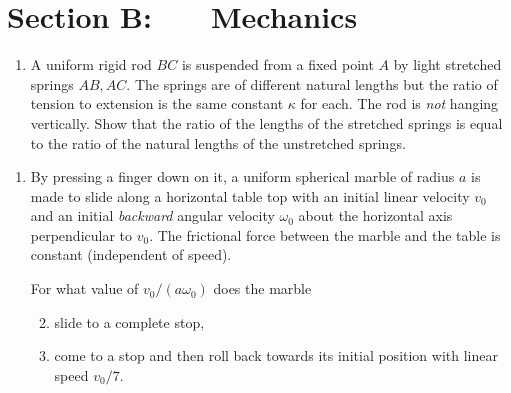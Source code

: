 \documentclass[a4, 11pt]{report}
\newlength{\qspace}
\newcounter{qnumber}
\newenvironment{question}%
 {\vspace{\qspace}
  \begin{enumerate}[\bfseries 1\quad][10]%
    \setcounter{enumi}{\value{qnumber}}%
    \item%
 }
{
  \end{enumerate}
  \filbreak
  \stepcounter{qnumber}
 }
\newenvironment{questionparts}[1][1]%
 {
  \begin{enumerate}[\bfseries (i)]%
    \setcounter{enumii}{#1}
    \addtocounter{enumii}{-1}
    \setlength{\itemsep}{5mm}
    \setlength{\parskip}{8pt}
 }
 {
  \end{enumerate}
 }
\begin{document}
		
	
\newpage
\section*{Section B: \ \ \ Mechanics}


	
\begin{question}
A uniform rigid rod $BC$ is suspended from a fixed point $A$
by light stretched springs $AB,AC$. The springs are of different
natural lengths but the ratio of tension to extension is the same
constant $\kappa$ for each. The rod is {\em not} hanging
vertically. Show that the ratio of the lengths of the stretched
springs is equal to the ratio of the natural lengths of the unstretched
springs.
	\end{question}
	
\begin{question}	
By pressing a finger down on it, a uniform spherical marble of 
radius $a$  is made to slide  along a 
horizontal table top with an initial linear velocity $v_0$
and an initial {\sl backward} angular velocity $\omega_0$ about the
horizontal axis perpendicular to $v_0$. The frictional
force  between the marble and the table is constant (independent of
speed).


For what value of $v_0/(a\omega_0)$ does the marble

\begin{questionparts}
\item slide to a complete stop,

\item  come to a stop and then roll back towards its initial position
with linear speed $v_0/7$.
\end{questionparts}
\end{question}

\end{document}
